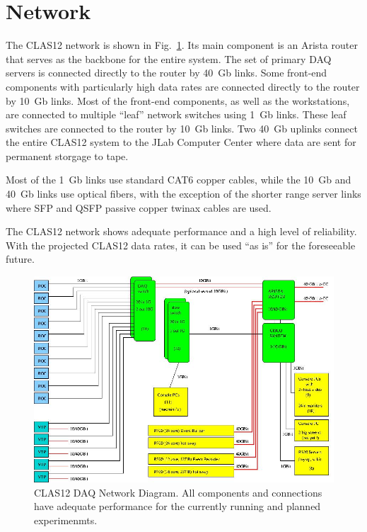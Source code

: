 \section{Network}

The CLAS12 network is shown in Fig.~\ref{fig:network_diagram}. Its main component is an Arista router that serves as the backbone for the entire system. The set of primary DAQ servers is connected directly to the router by 40~Gb links. Some front-end components with particularly high data rates are connected directly to the router by 10~Gb links. Most of the front-end components, as well as the workstations, are connected to multiple ``leaf'' network switches using 1~Gb links. These leaf switches are connected to the router by 10~Gb links. Two 40~Gb uplinks connect the entire CLAS12 system to the JLab Computer Center where data are sent for permanent storgage to tape.

Most of the 1~Gb links use standard CAT6 copper cables, while the 10~Gb and 40~Gb links use optical fibers, with the exception of the shorter range server links where SFP and QSFP passive copper twinax cables are used.

The CLAS12 network shows adequate performance and a high level of reliability. With the projected CLAS12 data rates, it can be used ``as is'' for the foreseeable future.

\begin{figure}[hbt]
	\centering
	\includegraphics[width=1.0\columnwidth,keepaspectratio]{img/CLAS12_NET_1.jpg}
	\caption{CLAS12 DAQ Network Diagram. All components and connections have adequate performance for the currently running and planned experimenmts.}
	\label{fig:network_diagram}
\end{figure}
